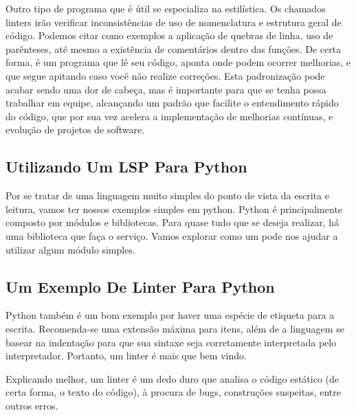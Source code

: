 Outro tipo de programa que é útil se especializa na estilística.
Os chamados linters irão verificar inconsistências de uso de nomenclatura e
estrutura geral de código. Podemos citar como exemplos a aplicação de quebras de linha, uso de parênteses,
até mesmo a existência de comentários dentro das funções.
De certa forma, é um programa que lê seu código, aponta onde podem ocorrer melhorias, e que segue apitando
caso você não realize correções.
Esta padronização pode acabar sendo uma dor de cabeça, mas é importante para que se tenha possa trabalhar em equipe,
alcançando um padrão que facilite o entendimento rápido do código, que por sua vez acelera a implementação de melhorias
contínuas, e evolução de projetos de software.

\subsection{Utilizando Um LSP Para Python}
Por se tratar de uma linguagem muito simples do ponto de vista da escrita e leitura,
vamos ter nossos exemplos simples em python.
Python é principalmente composto por módulos e bibliotecas.
Para quase tudo que se deseja realizar, há uma biblioteca que faça o serviço.
Vamos explorar como um  pode nos ajudar a utilizar algum módulo simples.


\subsection{Um Exemplo De Linter Para Python}
Python também é um bom exemplo por haver uma espécie de etiqueta para a escrita.
Recomenda-se uma extensão máxima para itens, além de a linguagem se basear na indentação
para que sua sintaxe seja corretamente interpretada pelo interpretador.
Portanto, um linter é mais que bem vindo.


Explicando melhor, um linter é um dedo duro que analisa o código estático (de certa forma, o texto do código),
à procura de bugs, construções suspeitas, entre outros erros.

\newpage
